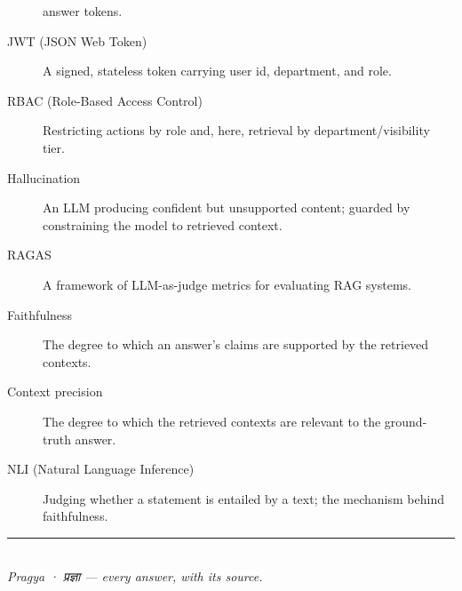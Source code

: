 \documentclass[11pt,a4paper,oneside]{report}
\begin{document}
\begin{description}
  answer tokens.
  \item[JWT (JSON Web Token)] A signed, stateless token carrying user id, department, and role.
  \item[RBAC (Role-Based Access Control)] Restricting actions by role and, here, retrieval by
  department/visibility tier.
  \item[Hallucination] An LLM producing confident but unsupported content; guarded by constraining the
  model to retrieved context.
  \item[RAGAS] A framework of LLM-as-judge metrics for evaluating RAG systems.
  \item[Faithfulness] The degree to which an answer's claims are supported by the retrieved contexts.
  \item[Context precision] The degree to which the retrieved contexts are relevant to the ground-truth
  answer.
  \item[NLI (Natural Language Inference)] Judging whether a statement is entailed by a text; the
  mechanism behind faithfulness.
\end{description}

\vspace{1.2cm}
\begin{center}
{\color{ink}\rule{0.6\linewidth}{0.8pt}}\\[6pt]
{\itshape\color{amberdark} Pragya · प्रज्ञा --- every answer, with its source.}
\end{center}
\end{document}
